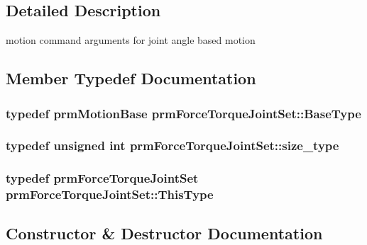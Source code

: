 \subsection{Detailed Description}
motion command arguments for joint angle based motion 

\subsection{Member Typedef Documentation}
\hypertarget{classprm_force_torque_joint_set_a5381a0507902adc394509c016450ad79}{}
\subsubsection[{Base\+Type}]{\setlength{\rightskip}{0pt plus 5cm}typedef {\bf prm\+Motion\+Base} {\bf prm\+Force\+Torque\+Joint\+Set\+::\+Base\+Type}}\label{classprm_force_torque_joint_set_a5381a0507902adc394509c016450ad79}
\hypertarget{classprm_force_torque_joint_set_a2fa9d363f410074de832a3f627f3b43b}{}
\subsubsection[{size\+\_\+type}]{\setlength{\rightskip}{0pt plus 5cm}typedef unsigned int {\bf prm\+Force\+Torque\+Joint\+Set\+::size\+\_\+type}}\label{classprm_force_torque_joint_set_a2fa9d363f410074de832a3f627f3b43b}
\hypertarget{classprm_force_torque_joint_set_a18867cb10dfae15004f3c72b30481f20}{}
\subsubsection[{This\+Type}]{\setlength{\rightskip}{0pt plus 5cm}typedef {\bf prm\+Force\+Torque\+Joint\+Set} {\bf prm\+Force\+Torque\+Joint\+Set\+::\+This\+Type}}\label{classprm_force_torque_joint_set_a18867cb10dfae15004f3c72b30481f20}


\subsection{Constructor \& Destructor Documentation}
\hypertarget{classprm_force_torque_joint_set_a5e9a84c3f2e5e0c7abc321248c3de996}{}
